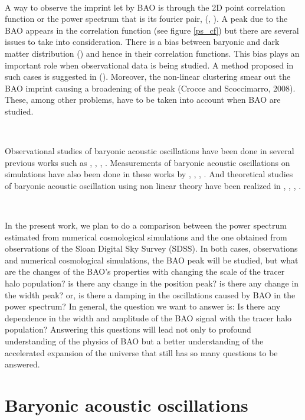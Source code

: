 \	

A way to observe the imprint let by BAO is through the 2D point correlation function or the power spectrum that is 
its fourier pair, (\cite{PLOT}, \cite{PLOT2}).  A peak due to the BAO appears in the correlation function (see figure \ref{ps_cf}) but there are 
several issues to take into consideration.
There is a bias between baryonic and dark matter distribution (\cite{Biases}) and hence in their correlation functions. This bias  
plays an important role when observational data 
is being studied. A method proposed in such cases is suggested in (\cite{HBM}). 
Moreover, the non-linear clustering smear out the BAO imprint causing a broadening of the peak (Crocce
and Scoccimarro, 2008). These, among other 
problems, have to be taken into account when BAO are studied. 

\

Observational studies of baryonic acoustic oscillations have been done in several previous works such 
as \cite{Obs01}, \cite{Obs02}, \cite{Obs03}, \cite{Obs04} . Measurements of baryonic acoustic oscillations on simulations 
have also been done in these works by \cite{Sim01}, \cite{Sim02}, \cite{Sim03}, \cite{Sim04}.
And theoretical studies of baryonic acoustic oscillation using non linear theory have been realized in \cite{Theo01}, \cite{Theo02},
\cite{Theo03}, \cite{last} .  

\

In the present work, we plan to do a comparison between the power spectrum estimated from numerical cosmological simulations
and the one obtained from observations of the Sloan Digital Sky Survey (SDSS). 
In both cases, observations and numerical cosmological simulations, the BAO 
peak will be studied, but what are the changes of the BAO's properties with changing the scale of the tracer halo population?
is there any change in the position peak? is there any change in the width peak? or, is there a damping in the oscillations
caused by BAO in the power spectrum? In general, the question we want to answer is: Is there any dependence in the width 
and amplitude of the BAO signal with the tracer halo population?
Answering this questions will lead not only to profound understanding of the physics of
BAO but a better understanding of the accelerated expansion of the universe that still has so many questions to be answered. 


\section{ Baryonic acoustic oscillations } 



